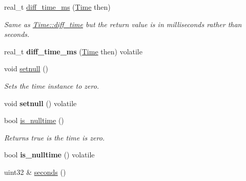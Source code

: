 \begin{DoxyCompactItemize}
\item 
\hypertarget{classetk_1_1_time_a38df737d74c4e116c12e00f80e0cbb15}{real\-\_\-t \hyperlink{classetk_1_1_time_a38df737d74c4e116c12e00f80e0cbb15}{diff\-\_\-time\-\_\-ms} (\hyperlink{classetk_1_1_time}{Time} then)}\label{classetk_1_1_time_a38df737d74c4e116c12e00f80e0cbb15}

\begin{DoxyCompactList}\small\item\em Same as \hyperlink{classetk_1_1_time_a28a06c9d23c9a67d1a1bfcde18c4d026}{Time\-::diff\-\_\-time} but the return value is in milliseconds rather than seconds. \end{DoxyCompactList}\item 
\hypertarget{classetk_1_1_time_af647565d37e52ce0fbb12e48a4cec0fb}{real\-\_\-t {\bfseries diff\-\_\-time\-\_\-ms} (\hyperlink{classetk_1_1_time}{Time} then) volatile}\label{classetk_1_1_time_af647565d37e52ce0fbb12e48a4cec0fb}

\item 
\hypertarget{classetk_1_1_time_ab38fb137fe9e0477c2dcc4eae12d05c9}{void \hyperlink{classetk_1_1_time_ab38fb137fe9e0477c2dcc4eae12d05c9}{setnull} ()}\label{classetk_1_1_time_ab38fb137fe9e0477c2dcc4eae12d05c9}

\begin{DoxyCompactList}\small\item\em Sets the time instance to zero. \end{DoxyCompactList}\item 
\hypertarget{classetk_1_1_time_af0d9e8da96c5eb92811a6ec239b9ffa5}{void {\bfseries setnull} () volatile}\label{classetk_1_1_time_af0d9e8da96c5eb92811a6ec239b9ffa5}

\item 
\hypertarget{classetk_1_1_time_a1728c210b6e053548d5de2d7b8fd91f4}{bool \hyperlink{classetk_1_1_time_a1728c210b6e053548d5de2d7b8fd91f4}{is\-\_\-nulltime} ()}\label{classetk_1_1_time_a1728c210b6e053548d5de2d7b8fd91f4}

\begin{DoxyCompactList}\small\item\em Returns true is the time is zero. \end{DoxyCompactList}\item 
\hypertarget{classetk_1_1_time_ad04d01890c9d5519966532873aa54255}{bool {\bfseries is\-\_\-nulltime} () volatile}\label{classetk_1_1_time_ad04d01890c9d5519966532873aa54255}

\item 
\hypertarget{classetk_1_1_time_a5cb525e51fd81234d6455b1ee99aa756}{uint32 \& \hyperlink{classetk_1_1_time_a5cb525e51fd81234d6455b1ee99aa756}{seconds} ()}\label{classetk_1_1_time_a5cb525e51fd81234d6455b1ee99aa756}


\end{DoxyCompactItemize}
